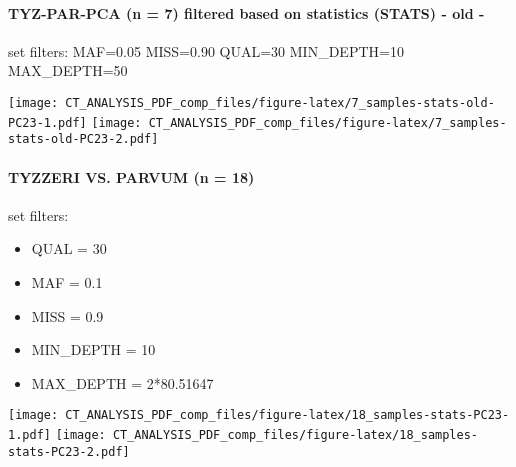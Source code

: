 \documentclass[
]{article}
\providecommand{\tightlist}{%
  \setlength{\itemsep}{0pt}\setlength{\parskip}{0pt}}
\begin{document}
\hypertarget{tyz-par-pca-n-7-filtered-based-on-statistics-stats---old---1}{%
\paragraph{TYZ-PAR-PCA (n = 7) filtered based on statistics (STATS) -
old
-}\label{tyz-par-pca-n-7-filtered-based-on-statistics-stats---old---1}}

set filters: MAF=0.05 MISS=0.90 QUAL=30 MIN\_DEPTH=10 MAX\_DEPTH=50

\texttt{[image: CT\_ANALYSIS\_PDF\_comp\_files/figure-latex/7\_samples-stats-old-PC23-1.pdf]}
\texttt{[image: CT\_ANALYSIS\_PDF\_comp\_files/figure-latex/7\_samples-stats-old-PC23-2.pdf]}

\hypertarget{tyzzeri-vs.-parvum-n-18-1}{%
\paragraph{TYZZERI VS. PARVUM (n =
18)}\label{tyzzeri-vs.-parvum-n-18-1}}

set filters:

\begin{itemize}
\tightlist
\item
  QUAL = 30
\item
  MAF = 0.1
\item
  MISS = 0.9
\item
  MIN\_DEPTH = 10
\item
  MAX\_DEPTH = 2*80.51647
\end{itemize}

\texttt{[image: CT\_ANALYSIS\_PDF\_comp\_files/figure-latex/18\_samples-stats-PC23-1.pdf]}
\texttt{[image: CT\_ANALYSIS\_PDF\_comp\_files/figure-latex/18\_samples-stats-PC23-2.pdf]}
\end{document}
